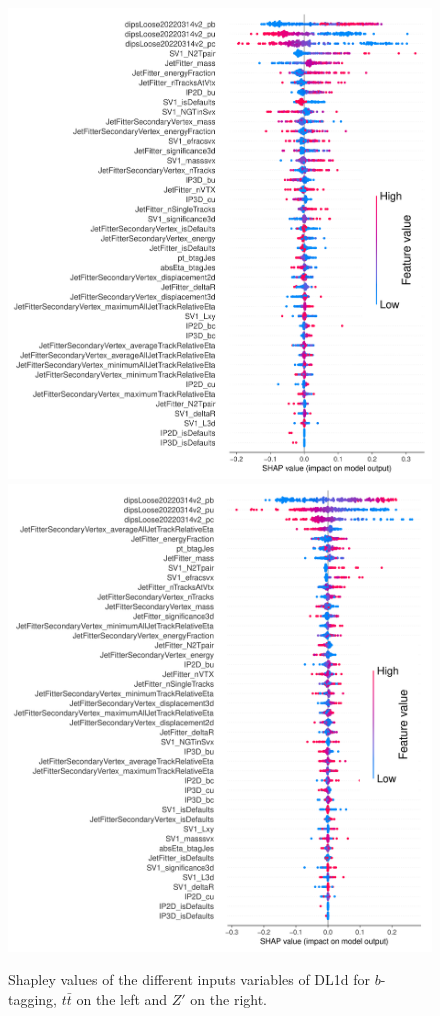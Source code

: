 \begin{figure}
  \centering
  \includegraphics[scale=0.7]{Images/FTAG/DL1d/Shap/ttb.png}
  \includegraphics[scale=0.7]{Images/FTAG/DL1d/Shap/zpb.png}
  \caption{Shapley values of the different inputs variables of DL1d for $b$-tagging, $t\bar{t}$ on the left and $Z'$ on the right.} 
  \label{fig:DL1dshapb}
\end{figure} 


